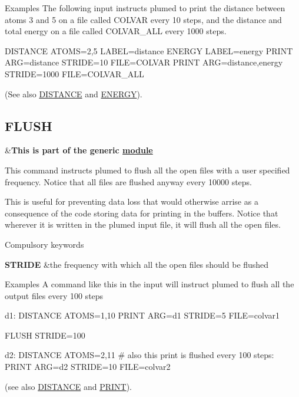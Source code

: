 \begin{DoxyParagraph}{Examples}
The following input instructs plumed to print the distance between atoms 3 and 5 on a file called C\+O\+L\+V\+A\+R every 10 steps, and the distance and total energy on a file called C\+O\+L\+V\+A\+R\+\_\+\+A\+L\+L every 1000 steps. \begin{DoxyVerb}DISTANCE ATOMS=2,5 LABEL=distance
ENERGY             LABEL=energy
PRINT ARG=distance          STRIDE=10   FILE=COLVAR
PRINT ARG=distance,energy   STRIDE=1000 FILE=COLVAR_ALL
\end{DoxyVerb}
 (See also \hyperlink{DISTANCE}{D\+I\+S\+T\+A\+N\+C\+E} and \hyperlink{ENERGY}{E\+N\+E\+R\+G\+Y}). 
\end{DoxyParagraph}
\hypertarget{FLUSH}{}\subsection{F\+L\+U\+S\+H}\label{FLUSH}
\begin{TabularC}{2}
\hline
&{\bfseries  This is part of the generic \hyperlink{mymodules}{module }}   \\
\end{TabularC}
This command instructs plumed to flush all the open files with a user specified frequency. Notice that all files are flushed anyway every 10000 steps.

This is useful for preventing data loss that would otherwise arrise as a consequence of the code storing data for printing in the buffers. Notice that wherever it is written in the plumed input file, it will flush all the open files.

\begin{DoxyParagraph}{Compulsory keywords}

\end{DoxyParagraph}
\begin{TabularC}{2}
\hline
{\bfseries  S\+T\+R\+I\+D\+E } &the frequency with which all the open files should be flushed   \\
\end{TabularC}


\begin{DoxyParagraph}{Examples}
A command like this in the input will instruct plumed to flush all the output files every 100 steps \begin{DoxyVerb}d1: DISTANCE ATOMS=1,10
PRINT ARG=d1 STRIDE=5 FILE=colvar1

FLUSH STRIDE=100

d2: DISTANCE ATOMS=2,11
# also this print is flushed every 100 steps:
PRINT ARG=d2 STRIDE=10 FILE=colvar2
\end{DoxyVerb}
 (see also \hyperlink{DISTANCE}{D\+I\+S\+T\+A\+N\+C\+E} and \hyperlink{PRINT}{P\+R\+I\+N\+T}). 
\end{DoxyParagraph}
